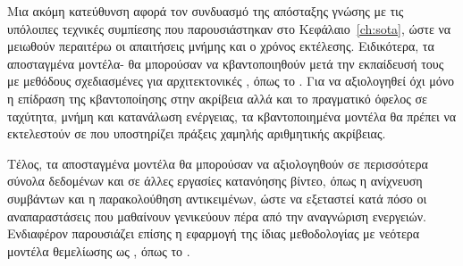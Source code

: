 Μια ακόμη κατεύθυνση αφορά τον συνδυασμό της απόσταξης γνώσης με τις
υπόλοιπες τεχνικές συμπίεσης που παρουσιάστηκαν στο
Κεφάλαιο~\ref{ch:sota}, ώστε να μειωθούν περαιτέρω οι απαιτήσεις
μνήμης και ο χρόνος εκτέλεσης. Ειδικότερα, τα αποσταγμένα μοντέλα-
θα μπορούσαν να κβαντοποιηθούν μετά την εκπαίδευσή τους με μεθόδους
σχεδιασμένες για αρχιτεκτονικές , όπως το
 \cite{li2023repqvit}. Για να αξιολογηθεί όχι μόνο η επίδραση της κβαντοποίησης
στην ακρίβεια αλλά και το πραγματικό όφελος σε ταχύτητα, μνήμη και
κατανάλωση ενέργειας, τα κβαντοποιημένα μοντέλα θα πρέπει να
εκτελεστούν σε  που υποστηρίζει πράξεις χαμηλής
αριθμητικής ακρίβειας.

Τέλος, τα αποσταγμένα μοντέλα θα μπορούσαν να αξιολογηθούν σε
περισσότερα σύνολα δεδομένων και σε άλλες εργασίες κατανόησης βίντεο,
όπως η ανίχνευση συμβάντων και η παρακολούθηση αντικειμένων, ώστε να
εξεταστεί κατά πόσο οι αναπαραστάσεις που μαθαίνουν γενικεύουν πέρα
από την αναγνώριση ενεργειών. Ενδιαφέρον παρουσιάζει
επίσης η εφαρμογή της ίδιας μεθοδολογίας με νεότερα μοντέλα θεμελίωσης
ως , όπως το  \cite{assran2025vjepa2}.
